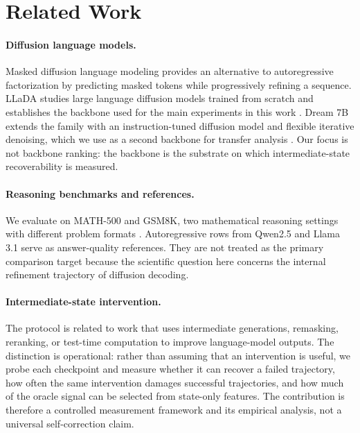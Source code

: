 \section{Related Work}

\paragraph{Diffusion language models.}
Masked diffusion language modeling provides an alternative to autoregressive factorization by predicting masked tokens while progressively refining a sequence. LLaDA studies large language diffusion models trained from scratch and establishes the backbone used for the main experiments in this work \cite{llada}. Dream 7B extends the family with an instruction-tuned diffusion model and flexible iterative denoising, which we use as a second backbone for transfer analysis \cite{dream}. Our focus is not backbone ranking: the backbone is the substrate on which intermediate-state recoverability is measured.

\paragraph{Reasoning benchmarks and references.}
We evaluate on MATH-500 and GSM8K, two mathematical reasoning settings with different problem formats \cite{math,gsm8k}. Autoregressive rows from Qwen2.5 and Llama 3.1 serve as answer-quality references. They are not treated as the primary comparison target because the scientific question here concerns the internal refinement trajectory of diffusion decoding.

\paragraph{Intermediate-state intervention.}
The protocol is related to work that uses intermediate generations, remasking, reranking, or test-time computation to improve language-model outputs. The distinction is operational: rather than assuming that an intervention is useful, we probe each checkpoint and measure whether it can recover a failed trajectory, how often the same intervention damages successful trajectories, and how much of the oracle signal can be selected from state-only features. The contribution is therefore a controlled measurement framework and its empirical analysis, not a universal self-correction claim.
